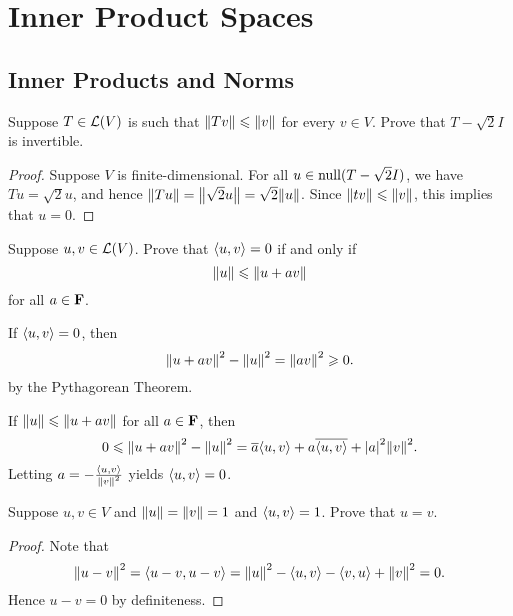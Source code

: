 \chapter{Inner Product Spaces}

\section{Inner Products and Norms}

\begin{exercise}{5}
	Suppose \( T \in \operatorname{\mathcal{L}}(V) \) is such that \( \norm{Tv} \le \norm{v} \) for every \( v \in V \). Prove that \( T-\sqrt{2}I \) is invertible.
\end{exercise}

\begin{proof}
	Suppose \( V \) is finite-dimensional. For all \( u \in \operatorname{null}(T - \sqrt{2}I) \), we have \( Tu = \sqrt{2}u \), and hence \( \norm{Tu} = \norm{\sqrt{2}u} = \sqrt{2}\norm{u} \). Since \( \norm{tv} \le \norm{v} \), this implies that \( u = 0 \).
\end{proof}

\begin{exercise}{6}
	Suppose \( u, v \in \operatorname{\mathcal{L}}(V) \). Prove that \( \inp{u}{v} = 0 \) if and only if
	\[
		\norm{u} \le \norm{u + av}
	\]
	for all \( a \in \mathbf{F} \).
\end{exercise}

\begin{solution}
	If \( \inp{u}{v} = 0 \), then
	\[
		\norm{u + av}^{2} - \norm{u}^{2} = \norm{av}^{2} \ge 0.
	\]
	by the Pythagorean Theorem.

	If \( \norm{u} \le \norm{u + av} \) for all \( a \in \mathbf{F} \), then
	\[
		0 \le \norm{u + av}^{2} - \norm{u}^{2} = \conj{a}\inp{u}{v} + a\conj{\inp{u}{v}} + \abs{a}^{2}\norm{v}^{2}.
	\]
	Letting \( a = -\frac{\inp{u}{v}}{\norm{v}^{2}} \) yields \( \inp{u}{v} = 0 \).
\end{solution}

\begin{exercise}{8}
	Suppose \( u, v \in V \) and \( \norm{u} = \norm{v} = 1 \) and \( \inp{u}{v} = 1 \). Prove that \( u = v \).
\end{exercise}

\begin{proof}
	Note that
	\[
		\norm{u - v}^{2} = \inp{u - v}{u - v} = \norm{u}^{2} - \inp{u}{v} - \inp{v}{u} + \norm{v}^{2} = 0.
	\]
	Hence \( u - v = 0 \) by definiteness.
\end{proof}


